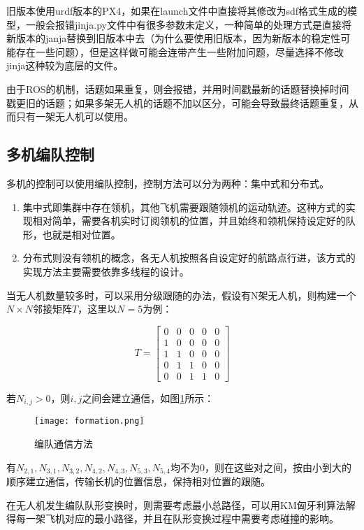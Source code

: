 旧版本使用urdf版本的PX4，如果在launch文件中直接将其修改为sdf格式生成的模型，一般会报错jinja.py文件中有很多参数未定义，一种简单的处理方式是直接将新版本的janja替换到旧版本中去（为什么要使用旧版本，因为新版本的稳定性可能存在一些问题），但是这样做可能会连带产生一些附加问题，尽量选择不修改jinja这种较为底层的文件。

由于ROS的机制，话题如果重复，则会报错，并用时间戳最新的话题替换掉时间戳更旧的话题；如果多架无人机的话题不加以区分，可能会导致最终话题重复，从而只有一架无人机可以使用。


\subsection{多机编队控制} \label{4.3.2}

多机的控制可以使用编队控制，控制方法可以分为两种：集中式和分布式。

\begin{enumerate}
	\item 集中式即集群中存在领机，其他飞机需要跟随领机的运动轨迹。这种方式的实现相对简单，需要各机实时订阅领机的位置，并且始终和领机保持设定好的队形，也就是相对位置。
	\item 分布式则没有领机的概念，各无人机按照各自设定好的航路点行进，该方式的实现方法主要需要依靠多线程的设计。
\end{enumerate}

当无人机数量较多时，可以采用分级跟随的办法，假设有N架无人机，则构建一个$N \times N$邻接矩阵$T$，这里以$N=5$为例：

$$
T=\begin{bmatrix}
0 & 0 & 0 & 0 & 0\\
1 & 0 & 0 & 0 & 0\\
1 & 1 & 0 & 0 & 0\\
0 & 1 & 1 & 0 & 0\\
0 & 0 & 1 & 1 & 0
\end{bmatrix}
$$

若$N_{i,j}>0$，则$i,j$之间会建立通信，如图\ref{fig4-7}所示：

\begin{figure}[!ht]
	\centering
	\texttt{[image: formation.png]}
	\caption{编队通信方法}
	\label{fig4-7}
\end{figure}

有$N_{2,1},N_{3,1},N_{3,2},N_{4,2},N_{4,3},N_{5,3},N_{5,4}$均不为0，则在这些对之间，按由小到大的顺序建立通信，传输长机的位置信息，保持相对位置的跟随。

在无人机发生编队队形变换时，则需要考虑最小总路径，可以用KM匈牙利算法解得每一架飞机对应的最小路径，并且在队形变换过程中需要考虑碰撞的影响\cite{XiaoKun}。

